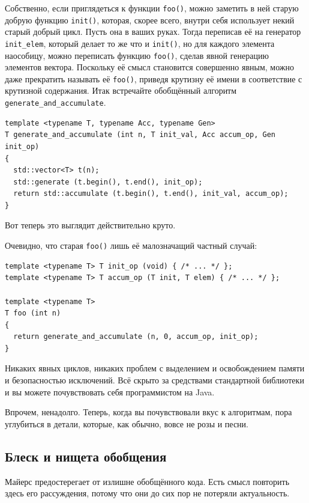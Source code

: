 \documentclass[a4paper,12pt,oneside]{article}
\begin{document}
Собственно, если приглядеться к функции \lstinline!foo()!, можно заметить в ней старую добрую функцию \lstinline!init()!, которая, скорее всего, внутри себя использует некий старый добрый цикл. Пусть она в ваших руках. Тогда переписав её на генератор \lstinline!init_elem!, который делает то же что и \lstinline!init()!, но для каждого элемента наособицу, можно переписать функцию \lstinline!foo()!, сделав явной генерацию элементов вектора. Поскольку её смысл становится совершенно явным, можно даже прекратить называть её \lstinline!foo()!, приведя крутизну её имени в соответствие с крутизной содержания. Итак встречайте обобщённый алгоритм \lstinline!generate_and_accumulate!.

\begin{lstlisting}
template <typename T, typename Acc, typename Gen>
T generate_and_accumulate (int n, T init_val, Acc accum_op, Gen init_op)
{
  std::vector<T> t(n);
  std::generate (t.begin(), t.end(), init_op);
  return std::accumulate (t.begin(), t.end(), init_val, accum_op);
}
\end{lstlisting}

Вот теперь это выглядит действительно круто.

Очевидно, что старая \lstinline!foo()! лишь её малозначащий частный случай:

\begin{lstlisting}
template <typename T> T init_op (void) { /* ... */ };
template <typename T> T accum_op (T init, T elem) { /* ... */ };

template <typename T> 
T foo (int n)
{
  return generate_and_accumulate (n, 0, accum_op, init_op);
}
\end{lstlisting}

Никаких явных циклов, никаких проблем с выделением и освобождением памяти и безопасностью исключений. Всё скрыто за средствами стандартной библиотеки и вы можете почувствовать себя программистом на Java.

Впрочем, ненадолго. Теперь, когда вы почувствовали вкус к алгоритмам, пора углубиться в детали, которые, как обычно, вовсе не розы и песни.

\subsection{Блеск и нищета обобщения}

Майерс \cite{effectivestl} предостерегает от излишне обобщённого кода. Есть смысл повторить здесь его рассуждения, потому что они до сих пор не потеряли актуальность. 
\end{document}
